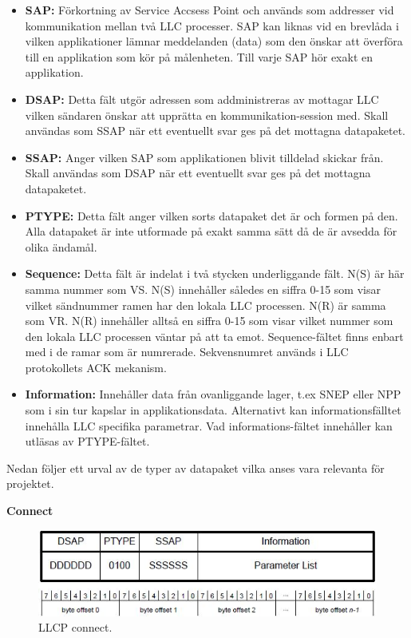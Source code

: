 \documentclass[11pt]{article}
\begin{document}
\begin{itemize}
\item \textbf{SAP:} Förkortning av Service Accsess Point och används som addresser vid kommunikation mellan två LLC processer. SAP kan liknas vid en brevlåda i vilken applikationer lämnar meddelanden (data) som den önskar att överföra till en applikation som kör på målenheten. Till varje SAP hör exakt en applikation. 
\item \textbf{DSAP:} Detta fält utgör adressen som addministreras av mottagar LLC vilken sändaren önskar att upprätta en kommunikation-session med. Skall användas som SSAP när ett eventuellt svar ges på det mottagna datapaketet.
\item \textbf{SSAP:} Anger vilken SAP som applikationen blivit tilldelad skickar från. Skall användas som DSAP när ett eventuellt svar ges på det mottagna datapaketet.
\item \textbf{PTYPE:} Detta fält anger vilken sorts datapaket det är och formen på den. Alla datapaket är inte utformade  på exakt samma sätt då de är avsedda för olika ändamål.
\item \textbf{Sequence:} Detta fält är indelat i två stycken underliggande fält. N(S) är här samma nummer som VS. N(S) innehåller således en siffra 0-15 som visar vilket sändnummer ramen har den lokala LLC processen. N(R) är samma som VR. N(R) innehåller alltså en siffra 0-15 som visar vilket nummer som den lokala LLC processen väntar på att ta emot. Sequence-fältet finns enbart med i de ramar som är numrerade. Sekvensnumret används i LLC protokollets ACK mekanism.
\item \textbf{Information:} Innehåller data från ovanliggande lager, t.ex SNEP eller NPP som i sin tur kapslar in applikationsdata. Alternativt kan informationsfälltet innehålla LLC specifika parametrar. Vad informations-fältet innehåller kan utläsas av PTYPE-fältet.
\end{itemize}

Nedan följer ett urval av de typer av datapaket vilka anses vara relevanta för projektet.

\textbf{Connect}

\begin{figure}[H]
\centering
\includegraphics[scale=0.8]{LLCP_connect.jpg}
\caption{LLCP connect.}
\label{fig:LLCP_connect}
\end{figure}
\end{document}

